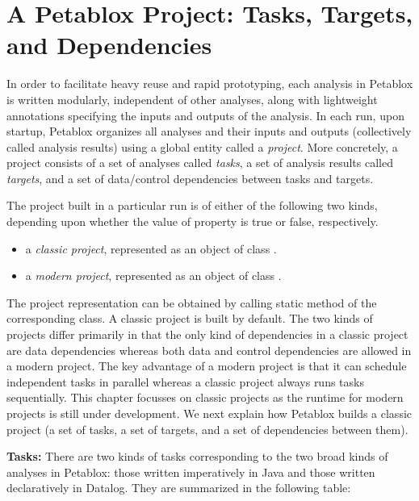 \chapter{A Petablox Project: Tasks, Targets, and Dependencies}
\label{chap:project}

In order to facilitate heavy reuse and rapid prototyping, each analysis in Petablox is
written modularly, independent of other analyses, along with lightweight annotations
specifying the inputs and outputs of the analysis.
In each run, upon startup, Petablox organizes all analyses and their inputs and outputs
(collectively called analysis results) using a global entity
called a {\it project}.  More concretely, a project consists of a set of
analyses called {\it tasks}, a set of analysis results called {\it targets}, and
a set of data/control dependencies between tasks and targets.

The project built in a particular run is of either of the following two kinds,
depending upon whether the value of property  is true or false, respectively.
\begin{itemize}
\item
a {\it classic project}, represented as an object of
class .
\item
a {\it modern project}, represented as an object of
class .
\end{itemize}
The project representation can be obtained by calling static method  of the
corresponding class.
A classic project is built by default.
The two kinds of projects differ
primarily in that the only kind of dependencies in a classic
project are data dependencies whereas both data and control dependencies are
allowed in a modern project.  The key advantage of a modern project is that it
can schedule independent tasks in parallel whereas a classic project always
runs tasks sequentially.  This chapter focusses on classic projects as the
runtime for modern projects is still under development.
We next explain how Petablox builds a classic project
(a set of tasks, a set of targets, and a set of dependencies between them).

{\bf Tasks:}
There are two kinds of tasks corresponding to the two broad kinds of analyses in
Petablox: those written imperatively in Java and those written declaratively in
Datalog.  They are summarized in the following table:

